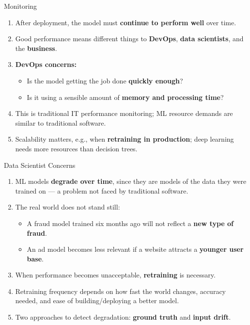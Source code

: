 \begin{frame}{Monitoring}
\begin{enumerate}
\item<1-> After deployment, the model must \textbf{continue to perform well} over time.
\item<2-> Good performance means different things to \textbf{DevOps}, \textbf{data scientists}, and the \textbf{business}.
\item<3-> \textbf{DevOps concerns:}
    \begin{itemize}
    \item Is the model getting the job done \textbf{quickly enough}?
    \item Is it using a sensible amount of \textbf{memory and processing time}?
    \end{itemize}
\item<4-> This is traditional IT performance monitoring; ML resource demands are similar to traditional software.
\item<5-> Scalability matters, e.g., when \textbf{retraining in production}; deep learning needs more resources than decision trees.
\end{enumerate}
\end{frame}

\begin{frame}{Data Scientist Concerns}
\begin{enumerate}
\item<1-> ML models \textbf{degrade over time}, since they are models of the data they were trained on --- a problem not faced by traditional software.
\item<2-> The real world does not stand still:
    \begin{itemize}
    \item A fraud model trained six months ago will not reflect a \textbf{new type of fraud}.
    \item An ad model becomes less relevant if a website attracts a \textbf{younger user base}.
    \end{itemize}
\item<3-> When performance becomes unacceptable, \textbf{retraining} is necessary.
\item<4-> Retraining frequency depends on how fast the world changes, accuracy needed, and ease of building/deploying a better model.
\item<5-> Two approaches to detect degradation: \textbf{ground truth} and \textbf{input drift}.
\end{enumerate}
\end{frame}

